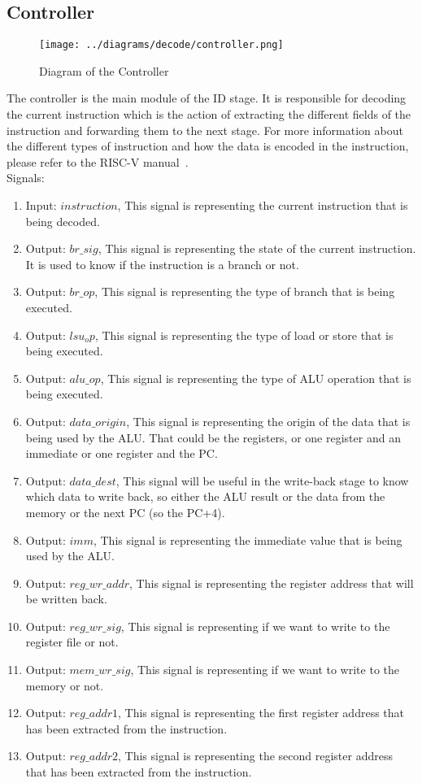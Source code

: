 \subsection{Controller}

\begin{figure}[H]
\centering
\texttt{[image: ../diagrams/decode/controller.png]}
\caption{Diagram of the Controller}
\label{fig:controller}
\end{figure}

The controller is the main module of the ID stage. It is responsible for decoding the current instruction which is the action
of extracting the different fields of the instruction and forwarding them to the next stage. For more information about the different
types of instruction and how the data is encoded in the instruction, please refer to the RISC-V manual~\cite{riscv_manual}. \\

Signals:
\begin{enumerate}[label={\textbullet}]
    \item Input: $instruction$, This signal is representing the current instruction that is being decoded.
    \item Output: $br\_sig$, This signal is representing the state of the current instruction. 
    It is used to know if the instruction is a branch or not.
    \item Output: $br\_op$, This signal is representing the type of branch that is being executed.
    \item Output: $lsu_op$, This signal is representing the type of load or store that is being executed.
    \item Output: $alu\_op$, This signal is representing the type of ALU operation that is being executed.
    \item Output: $data\_origin$, This signal is representing the origin of the data that is being used by the ALU.
    That could be the registers, or one register and an immediate or one register and the PC.
    \item Output: $data\_dest$, This signal will be useful in the write-back stage to know which data to write back,
    so either the ALU result or the data from the memory or the next PC (so the PC+4).
    \item Output: $imm$, This signal is representing the immediate value that is being used by the ALU.
    \item Output: $reg\_wr\_addr$, This signal is representing the register address that will be written back.
    \item Output: $reg\_wr\_sig$, This signal is representing if we want to write to the register file or not.
    \item Output: $mem\_wr\_sig$, This signal is representing if we want to write to the memory or not.
    \item Output: $reg\_addr1$, This signal is representing the first register address that has been extracted from the instruction.
    \item Output: $reg\_addr2$, This signal is representing the second register address that has been extracted from the instruction.
\end{enumerate}